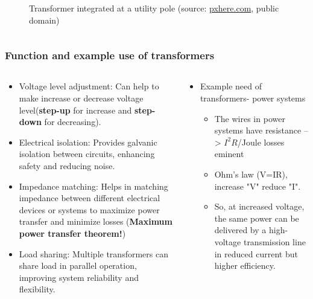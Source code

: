 \begin{frame}
\begin{columns}
\begin{column}{0.35\textwidth}
\begin{figure}
				\caption{Transformer integrated at a utility pole (source: \href{https://pxhere.com/en/photo/795672}{pxhere.com}, public domain)}
			\end{figure}
		\end{column}
		\end{columns}
\end{frame}


\begin{frame}
	\frametitle{Function and example use of transformers}
    \begin{columns}
		\begin{column}{0.45\textwidth}
            \begin{itemize}
              \item Voltage level adjustment: Can help to make increase or decrease voltage level(\textbf{step-up} for increase and \textbf{step-down} for decreasing). 
              \item Electrical isolation: Provides galvanic isolation between circuits, enhancing safety and reducing noise.
              \item Impedance matching: Helps in matching impedance between different electrical devices or systems to maximize power transfer and minimize losses (\textbf{Maximum power transfer theorem!})
              \item Load sharing:  Multiple transformers can share load in parallel operation, improving system reliability and flexibility.
            \end{itemize}
		\end{column}
        \hfill
		\begin{column}{0.525\textwidth}
        \begin{itemize}
          \item Example need of transformers- power systems
          \begin{itemize}
            \item The wires in power systems have resistance --> $I^2R$/Joule losses eminent
            \item Ohm's law (V=IR), increase "V" reduce "I".  
            \item So, at increased voltage, the same power can be delivered by a high-voltage transmission line in reduced current but higher efficiency. 
          \end{itemize}
			\begin{figure}

\end{figure}
\end{itemize}
\end{column}
\end{columns}
\end{frame}
